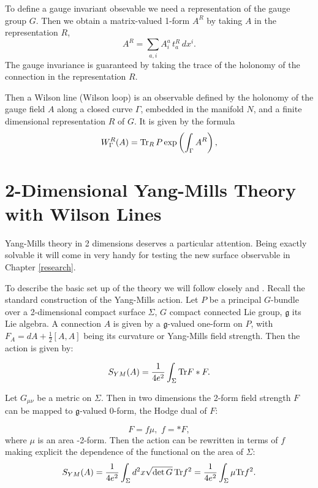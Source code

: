 \documentclass[11pt]{report}
\theoremstyle{plain}
\theoremstyle{definition}
\theoremstyle{remark}
\theoremstyle{remark}
\numberwithin{equation}{section}
\begin{document}
To define a gauge invariant obsevable we need a representation of the gauge group $G$. Then we obtain a matrix-valued 1-form $A^R$ by taking $A$ in the representation $R$,
%
\begin{equation}
A^R = \sum_{a,i} A^a_i \, t_a^R \, dx^i.
\end{equation}
The gauge invariance is guaranteed by taking the trace of the holonomy of the connection in the representation $R$. 



Then a Wilson line (Wilson loop) is an observable defined by the holonomy of the gauge field $A$ along a closed curve $\Gamma$, embedded in the manifold $N$, and a finite dimensional representation $R$ of $G$. It is given by the formula
%
\begin{equation}\label{WL}
W_\Gamma^R(A)= {\rm Tr}_R \, P\exp\left( \int_\Gamma A^R\right),
\end{equation}



\section{2-Dimensional Yang-Mills Theory with Wilson Lines}
Yang-Mills theory in 2 dimensions deserves a particular attention. Being exactly solvable it will come in very handy for testing the new surface observable in Chapter \ref{research}.

To describe the basic set up of the theory we will follow closely \cite{Moore} and \cite{Witten2}. Recall the standard construction of the Yang-Mills action. Let $P$ be a principal $G$-bundle over a 2-dimensional compact surface $\Sigma$, $G$ compact connected Lie group, $\mathfrak{g}$ its Lie algebra. A connection $A$ is given by a $\mathfrak{g}$-valued one-form on $P$, with $F_A = dA + \frac{1}{2} [A,A]$ being its curvature or Yang-Mills field strength. Then the action is given by:

$$ S_{YM}(A)  = \frac{1}{4 e^2} \int_{\Sigma} {\rm Tr} F \ast F.$$

Let $G_{\mu \nu}$ be a metric on $\Sigma$. Then in two dimensions the 2-form field strength $F$ can be mapped to $\mathfrak{g}$-valued 0-form, the Hodge dual of $F$:

$$ F = f\mu, \, \,  f = \ast F,$$
where  $\mu$ is an area -2-form.
Then the action can be rewritten in terms of $f$ making explicit the dependence of the functional on the area of $\Sigma$:
$$ S_{YM}(A)  = \frac{1}{4 e ^2} \int_{\Sigma} d^2 x \sqrt{{\rm det}\, G} \,{\rm Tr} f^2 =  \frac{1}{4 e ^2} \int_{\Sigma} \mu {\rm Tr} f^2.$$
\end{document}
